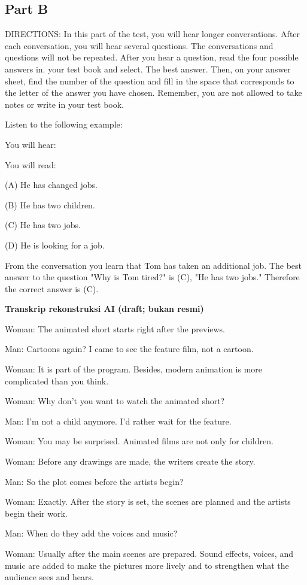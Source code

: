 \documentclass[12pt]{article}
\begin{document}
\subsection*{Part B}
DIRECTIONS: In this part of the test, you will hear longer conversations. After each conversation, you will hear several questions. The conversations and questions will not be repeated. After you hear a question, read the four possible answers in. your test book and select. The best answer. Then, on your answer sheet, find the number of the question and fill in the space that corresponds to the letter of the answer you have chosen. Remember, you are not allowed to take notes or write in your test book.\par
\begin{exampleblock}
Listen to the following example:\par
You will hear:\par
You will read:\par
(A) He has changed jobs.\par
(B) He has two children.\par
(C) He has two jobs.\par
(D) He is looking for a job.\par
From the conversation you learn that Tom has taken an additional job. The best answer to the question "Why is Tom tired?" is (C), "He has two jobs." Therefore the correct answer is (C).\par
\end{exampleblock}
\begin{exampleblock}
\textbf{Transkrip rekonstruksi AI (draft; bukan resmi)}\par
Woman: The animated short starts right after the previews.\par
Man: Cartoons again? I came to see the feature film, not a cartoon.\par
Woman: It is part of the program. Besides, modern animation is more complicated than you think.\par
Woman: Why don't you want to watch the animated short?\par
Man: I'm not a child anymore. I'd rather wait for the feature.\par
Woman: You may be surprised. Animated films are not only for children.\par
Woman: Before any drawings are made, the writers create the story.\par
Man: So the plot comes before the artists begin?\par
Woman: Exactly. After the story is set, the scenes are planned and the artists begin their work.\par
Man: When do they add the voices and music?\par
Woman: Usually after the main scenes are prepared. Sound effects, voices, and music are added to make the pictures more lively and to strengthen what the audience sees and hears.\par
\end{exampleblock}
\end{document}
